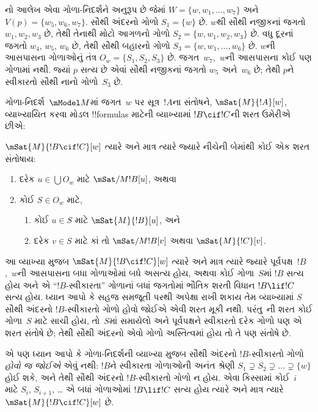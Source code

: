 \documentclass[../../../include/open-logic-section]{subfiles}
\begin{document}
નો આલેખ એવા ગોળા-નિદર્શને અનુરૂપ છે જેમાં
$W = \{w, w_1, \dots, w_7\}$ અને $V(p) = \{w_5, w_6,
w_7\}$. સૌથી અંદરનો ગોળો $S_1 = \{w\}$ છે. $w$થી સૌથી નજીકનાં
જગતો $w_1, w_2, w_3$ છે, તેથી તેનાથી મોટો આગળનો ગોળો
$S_2 = \{w, w_1, w_2, w_3\}$ છે. વધુ દૂરનાં જગતો $w_4$, $w_5$,
$w_6$ છે, તેથી સૌથી બહારનો ગોળો
$S_3 = \{w, w_1, \dots, w_6\}$ છે. $w$ની આસપાસના ગોળાઓનું તંત્ર
$O_w = \{S_1, S_2, S_3\}$ છે. જગત~$w_7$,~$w$ની આસપાસના કોઈ
પણ ગોળામાં નથી. જ્યાં $p$ સત્ય છે એવાં સૌથી નજીકનાં જગતો $w_5$
અને~$w_6$ છે; તેથી $p$ને સ્વીકારતો સૌથી નાનો ગોળો~$S_3$ છે.

ગોળા-નિદર્શ~$\mModel M$માં જગત~$w$ પર સૂત્ર~$!A$ના સંતોષને,
$\mSat{M}{!A}[w]$, વ્યાખ્યાયિત કરવા મોડલ !!{formula}s માટેની
વ્યાખ્યામાં $!B \cif !C$ની શરત ઉમેરીએ છીએ:

\begin{defn}
  $\mSat{M}{!B \cif !C}[w]$ ત્યારે અને માત્ર ત્યારે જ્યારે નીચેની
  બેમાંથી કોઈ એક શરત સંતોષાય:
  \begin{enumerate}
  \item{} દરેક $u \in \bigcup O_w$ માટે $\mSat/{M}{!B}[u]$, અથવા
  \item{} કોઈ $S \in O_w$ માટે,
    \begin{enumerate}
      \item કોઈ $u \in
        S$ માટે $\mSat{M}{!B}[u]$, અને
      \item દરેક $v \in S$ માટે કાં તો
        $\mSat/{M}{!B}[v]$ અથવા $\mSat{M}{!C}[v]$.
    \end{enumerate}
  \end{enumerate}
\end{defn}

આ વ્યાખ્યા મુજબ $\mSat{M}{!B \cif !C}[w]$ ત્યારે અને માત્ર ત્યારે
જ્યારે પૂર્વપક્ષ~$!B$,~$w$ની આસપાસના બધા ગોળાઓમાં બધે અસત્ય હોય,
અથવા કોઈ ગોળા~$S$માં $!B$ સત્ય હોય અને એ ``$!B$-સ્વીકારતા''
ગોળાનાં બધાં જગતોમાં ભૌતિક શરતી વિધાન $!B \lif !C$ સત્ય હોય.
ધ્યાન આપો કે સહજ સમજૂતી પરથી અપેક્ષા રાખી શકાય તેમ વ્યાખ્યામાં
$S$ સૌથી અંદરનો $!B$-સ્વીકારતો ગોળો હોવો જોઈએ એવી શરત મૂકી
નથી. પરંતુ~ની શરત કોઈ ગોળા~$S$ માટે સાચી
હોય, તો~$S$માં સમાયેલો અને પૂર્વપક્ષને સ્વીકારતો દરેક ગોળો પણ એ
શરત સંતોષે છે; તેથી સૌથી અંદરનો એવો ગોળો અસ્તિત્વમાં
હોય તો તે પણ સંતોષે છે.

એ પણ ધ્યાન આપો કે ગોળા-નિદર્શની વ્યાખ્યા મુજબ સૌથી અંદરનો
$!B$-સ્વીકારતો ગોળો \emph{હોવો જ જોઈએ} એવું નથી: $!B$ને સ્વીકારતા
ગોળાઓની અનંત શ્રેણી $S_1 \supsetneq S_2 \supsetneq \dots \supsetneq
\{w\}$ હોઈ શકે, અને તેથી સૌથી અંદરનો $!B$-સ્વીકારતો ગોળો ન હોય.
એવા કિસ્સામાં કોઈ~$i$ માટે $S_i$, $S_{i+1}$, \dots{} એ બધાં ગોળાઓમાં
$!B \lif !C$ સત્ય હોય ત્યારે અને માત્ર ત્યારે
$\mSat{M}{!B \cif !C}[w]$ છે.
\end{document}

